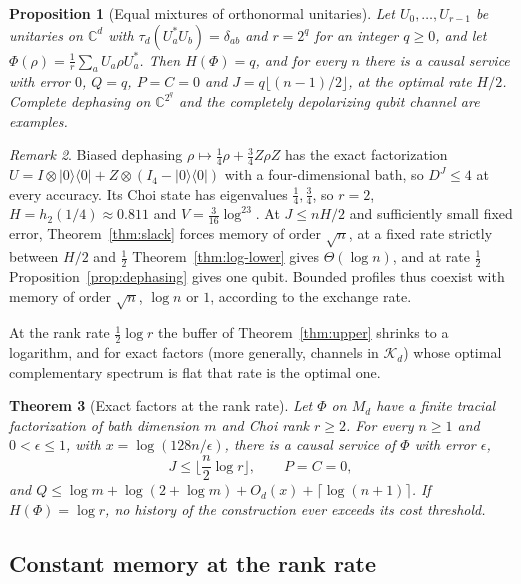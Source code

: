 \documentclass[11pt,a4paper]{article}
\theoremstyle{plain}
\newtheorem{theorem}{Theorem}[section]
\newtheorem{proposition}[theorem]{Proposition}
\theoremstyle{definition}
\theoremstyle{remark}
\newtheorem{remark}[theorem]{Remark}
\newcommand{\DChoi}{D^{J}}
\begin{document}
\begin{proposition}[Equal mixtures of orthonormal unitaries]\label{prop:weyl}
Let $U_0,\dots,U_{r-1}$ be unitaries on $\mathbb C^d$ with $\tau_d(U_a^*U_b)=\delta_{ab}$ and $r=2^q$ for an integer $q\ge0$, and let
$\Phi(\rho)=\frac1r\sum_aU_a\rho U_a^*$. Then $H(\Phi)=q$, and for every $n$ there is a causal service with error $0$, $Q=q$, $P=C=0$
and $J=q\lfloor(n-1)/2\rfloor$, at the optimal rate $H/2$. Complete dephasing on $\mathbb C^{2^q}$ and the completely depolarizing
qubit channel are examples.
\end{proposition}

\begin{remark}\label{rem:biased}
Biased dephasing $\rho\mapsto\frac14\rho+\frac34Z\rho Z$ has the exact factorization
$U=I\otimes|0\rangle\langle0|+Z\otimes(I_4-|0\rangle\langle0|)$ with a four-dimensional bath, so $\DChoi\le4$ at every accuracy.
Its Choi state has eigenvalues $\frac14,\frac34$, so $r=2$, $H=h_2(1/4)\approx0.811$ and $V=\frac3{16}\log^23$. At $J\le nH/2$ and sufficiently small fixed error,
Theorem~\ref{thm:slack} forces memory of order $\sqrt n$, at a fixed rate strictly between $H/2$ and $\frac12$
Theorem~\ref{thm:log-lower} gives $\Theta(\log n)$, and at rate $\frac12$ Proposition~\ref{prop:dephasing} gives one qubit. Bounded
profiles thus coexist with memory of order $\sqrt n$, $\log n$ or $1$, according to the exchange rate.
\end{remark}

At the rank rate $\frac12\log r$ the buffer of Theorem~\ref{thm:upper} shrinks to a logarithm, and for exact factors (more generally, channels in
$\mathcal K_d$) whose optimal complementary spectrum is flat that rate is the optimal one.

\begin{theorem}[Exact factors at the rank rate]\label{thm:rank-exact}
Let $\Phi$ on $M_d$ have a finite tracial factorization of bath dimension $m$ and Choi rank $r\ge2$. For every $n\ge1$ and $0<\epsilon\le1$, with
$x=\log(128n/\epsilon)$, there is a causal service of $\Phi$ with error $\epsilon$,
\[
J\le\Big\lfloor\frac n2\log r\Big\rfloor,\qquad P=C=0,
\]
and $Q\le\log m+\log(2+\log m)+O_d(x)+\lceil\log(n+1)\rceil$.
If $H(\Phi)=\log r$, no history of the construction ever exceeds its cost threshold.
\end{theorem}


\subsection{Constant memory at the rank rate}
\end{document}
